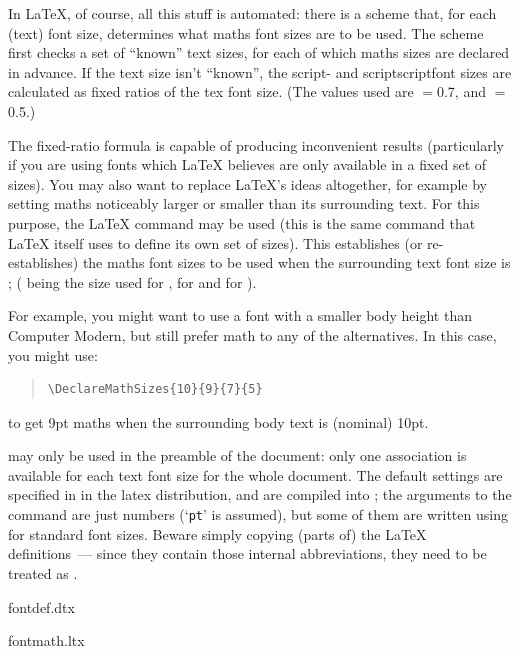 In \LaTeX{}, of course, all this stuff is automated: there is a scheme
that, for each (text) font size, determines what maths font sizes are
to be used.  The scheme first checks a set of ``known'' text sizes,
for each of which maths sizes are declared in advance.  If the text
size isn't ``known'', the script- and scriptscriptfont sizes are
calculated as fixed ratios of the tex font size.  (The values used are
\ensuremath{=}0.7, and
\ensuremath{=}0.5.)

The fixed-ratio formula is capable of producing inconvenient results
(particularly if you are using fonts which \LaTeX{} believes are only
available in a fixed set of sizes).  You may also want to replace
\LaTeX{}'s ideas altogether, for example by setting maths noticeably
larger or smaller than its surrounding text.  For this purpose, the
\LaTeX{} command
may be used (this is the same command that \LaTeX{} itself uses to
define its own set of sizes).  This establishes (or re-establishes)
the maths font sizes to be used when the surrounding text font size is
\texttt{}; (\texttt{} being the size used for
, \texttt{} for  and
\texttt{} for ).

For example, you might want to use a font with a smaller body height
than Computer Modern, but still prefer  math to any of the
alternatives.  In this case, you might use:
\begin{quote}
\begin{verbatim}
\DeclareMathSizes{10}{9}{7}{5}
\end{verbatim}
\end{quote}
to get 9pt maths when the surrounding body text is (nominal) 10pt.

 may only be used in the preamble of the
document: only one association is available for each text font size
for the whole document.  The default settings are specified in
 in the latex distribution, and are compiled into
; the arguments to the command are just numbers
(`\texttt{pt}' is assumed), but some of them are written using
 for standard font sizes.
Beware simply copying (parts of) the \LaTeX{} definitions~--- since
they contain those internal abbreviations, they need to be treated as
.
\begin{ctanrefs}
\item[fontdef.dtx]
\item[fontmath.ltx]
\end{ctanrefs}

